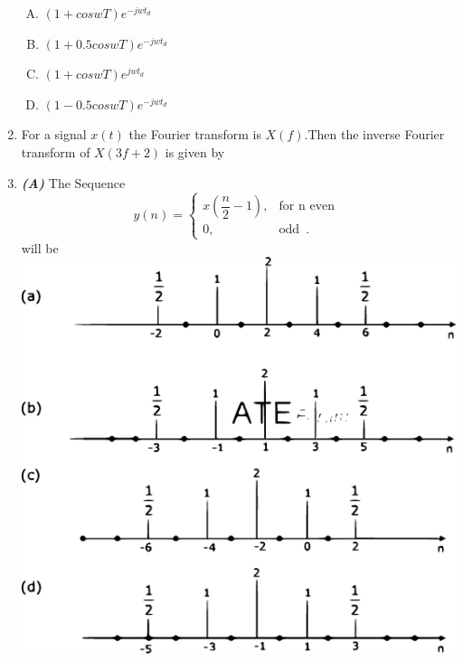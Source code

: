 \documentclass[journal,12pt,twocolumn]{IEEEtran}
\begin{document}
\begin{enumerate}[1.]
\begin{enumerate}[(A)]
\item $
(1+coswT)e^{-jwt_d}
$
\item $
(1+0.5coswT)e^{-jwt_d}
$
\item $
(1+coswT)e^{jwt_d}
$
\item $
(1-0.5coswT)e^{-jwt_d}
$

\end{enumerate}


\item For a signal $x(t)$ the Fourier transform is $X(f)$.Then the inverse Fourier transform of $X(3f+2)$ is given by
\begin{enumerate}[(A)]
\end{enumerate}

\item \textbf{\textit{(A)}} The Sequence \[
	y(n)=\begin{cases}
		x(\dfrac{n}{2}-1), & \text{for n even }  \\
		0, & \text{odd }\,.
	\end{cases}
\] will be\\
\includegraphics[scale=0.3]{fig6.eps}


\end{enumerate}
\end{document}
